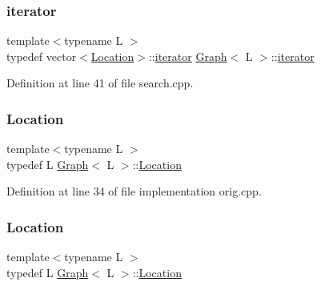 \mbox{\label{struct_graph_af43d6412d7a6034eaeacde8ca1c1d984}} 
\subsubsection{\texorpdfstring{iterator}{iterator}\hspace{0.1cm}{\footnotesize\ttfamily [2/2]}}
{\footnotesize\ttfamily template$<$typename L $>$ \\
typedef vector$<$\hyperlink{struct_graph_aea7d42bb67163fe692353674435a1426}{Location}$>$\+::\hyperlink{struct_graph_af43d6412d7a6034eaeacde8ca1c1d984}{iterator} \hyperlink{struct_graph}{Graph}$<$ L $>$\+::\hyperlink{struct_graph_af43d6412d7a6034eaeacde8ca1c1d984}{iterator}}



Definition at line 41 of file search.\+cpp.

\mbox{\label{struct_graph_aea7d42bb67163fe692353674435a1426}} 
\subsubsection{\texorpdfstring{Location}{Location}\hspace{0.1cm}{\footnotesize\ttfamily [1/2]}}
{\footnotesize\ttfamily template$<$typename L $>$ \\
typedef L \hyperlink{struct_graph}{Graph}$<$ L $>$\+::\hyperlink{struct_graph_aea7d42bb67163fe692353674435a1426}{Location}}



Definition at line 34 of file implementation orig.\+cpp.

\mbox{\label{struct_graph_aea7d42bb67163fe692353674435a1426}} 
\subsubsection{\texorpdfstring{Location}{Location}\hspace{0.1cm}{\footnotesize\ttfamily [2/2]}}
{\footnotesize\ttfamily template$<$typename L $>$ \\
typedef L \hyperlink{struct_graph}{Graph}$<$ L $>$\+::\hyperlink{struct_graph_aea7d42bb67163fe692353674435a1426}{Location}}



